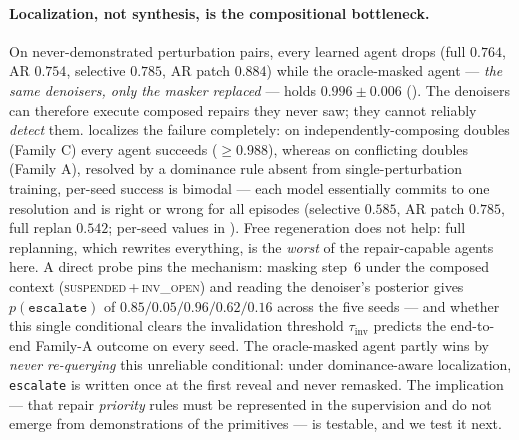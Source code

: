 \documentclass{article}
\newcommand{\tinv}{\tau_{\mathrm{inv}}}
\begin{document}
\paragraph{Localization, not synthesis, is the compositional bottleneck.} On
never-demonstrated perturbation pairs, every learned agent drops (full $0.764$, AR $0.754$,
selective $0.785$, AR patch $0.884$) while the oracle-masked agent --- \emph{the same denoisers,
only the masker replaced} --- holds $0.996\pm0.006$ (). The denoisers can therefore
execute composed repairs they never saw; they cannot reliably \emph{detect} them.
 localizes the failure completely: on independently-composing doubles (Family C)
every agent succeeds ($\geq 0.988$), whereas on conflicting doubles (Family A), resolved by a
dominance rule absent from single-perturbation training, per-seed success is bimodal --- each model
essentially commits to one resolution and is right or wrong for all episodes
(selective $0.585$, AR patch $0.785$, full replan $0.542$; per-seed values in ).
Free regeneration does not help: full replanning, which rewrites everything, is the \emph{worst} of
the repair-capable agents here. A direct probe pins the mechanism: masking step~6 under the composed
context (\textsc{suspended}\,+\,\textsc{inv\_open}) and reading the denoiser's posterior gives
$p(\texttt{escalate})$ of $0.85/0.05/0.96/0.62/0.16$ across the five seeds --- and whether this single
conditional clears the invalidation threshold $\tinv$ predicts the end-to-end Family-A outcome on
every seed. The oracle-masked agent
partly wins by \emph{never re-querying} this unreliable conditional: under dominance-aware
localization, \texttt{escalate} is written once at the first reveal and never remasked. The
implication --- that repair \emph{priority} rules must be represented in the supervision and do not
emerge from demonstrations of the primitives --- is testable, and we test it next.
\end{document}
